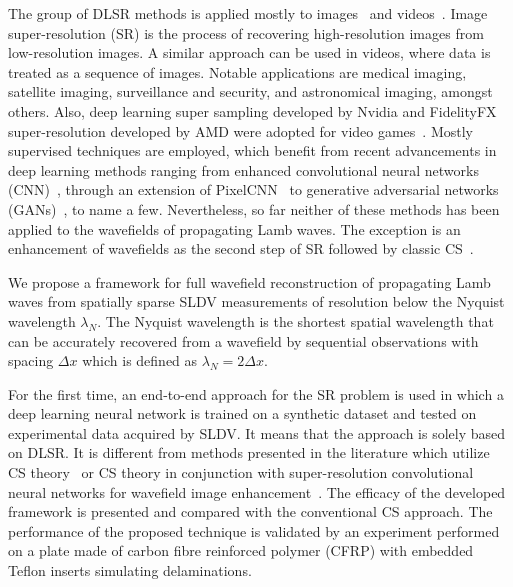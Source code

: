 The group of DLSR methods is applied mostly to images~\cite{Dahl2017,Zhang2018,Wang2019} and videos~\cite{Zhang2017,Yan2019}.
Image super-resolution (SR) is the process of recovering high-resolution images from low-resolution images.
A similar approach can be used in videos, where data is treated as a sequence of images.
Notable applications are medical imaging, satellite imaging, surveillance and security, and astronomical imaging, amongst others.
Also, deep learning super sampling developed by Nvidia and FidelityFX super-resolution developed by AMD were adopted for video games~\cite{Claypool2006}.
Mostly supervised techniques are employed, which benefit from recent advancements in deep learning methods ranging from enhanced convolutional neural networks (CNN)~\cite{Zhang2017}, through an extension of PixelCNN~\cite{Dahl2017} to generative adversarial networks (GANs)~\cite{Wang2019}, to name a few.
Nevertheless, so far neither of these methods has been applied to the wavefields of propagating Lamb waves.
The exception is an enhancement of wavefields as the second step of SR followed by classic CS~\cite{Park2017a,KeshmiriEsfandabadi2020}.

We propose a framework for full wavefield reconstruction of propagating Lamb waves from spatially sparse SLDV measurements of resolution below the Nyquist wavelength $\lambda_N$. 
The Nyquist wavelength is the shortest spatial wavelength that can be accurately recovered from a wavefield by sequential observations with spacing $\Delta x$ which is defined as $\lambda_N = 2 \Delta x$. 

For the first time, an end-to-end approach for the SR problem is used in which a deep learning neural network is trained on a synthetic dataset and tested on experimental data acquired by SLDV.
It means that the approach is solely based on DLSR.
It is different from methods presented in the literature which utilize CS theory~\cite{Harley2013, KeshmiriEsfandabadi2018} or CS theory in conjunction with super-resolution convolutional neural networks for wavefield image enhancement~\cite{Park2017a, KeshmiriEsfandabadi2020}.
The efficacy of the developed framework is presented and compared with the conventional CS approach.
The performance of the proposed technique is validated by an experiment performed on a plate made of carbon fibre reinforced polymer (CFRP) with embedded Teflon inserts simulating delaminations.
